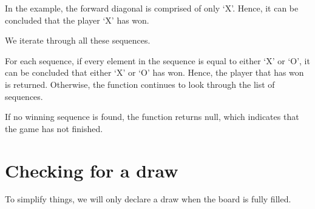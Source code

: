\documentclass{article}
\begin{document}
In the example, the forward diagonal is comprised of only `X'. Hence, it can be concluded that the player `X' has won.

We iterate through all these sequences.

For each sequence, if every element in the sequence is equal to either `X' or `O', it can be concluded that either `X' or `O' has won. Hence, the player that has won is returned. Otherwise, the function continues to look through the list of sequences.

If no winning sequence is found, the function returns null, which indicates that the game has not finished.

\section{Checking for a draw}

To simplify things, we will only declare a draw when the board is fully filled.
\end{document}
